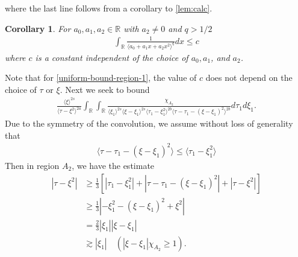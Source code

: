 \documentclass[12pt,reqno]{amsart}
\numberwithin{equation}{section}  %
\numberwithin{figure}{section}
\newcommand{\rr}{\mathbb{R}}
\theoremstyle{plain}
\newtheorem{corollary}{Corollary}
\theoremstyle{definition}
\theoremstyle{remark}
\begin{document}
%
%
where the last line follows from a corollary to \autoref{lem:calc}.
%
%
%
%
%
%
%
%
\begin{corollary}
  For $a_{0}, a_{1}, a_{2} \in \rr$ with $a_{2} \neq 0$ and $q > 1/2$
  \begin{equation*}
  \begin{split}
    \int_{\rr} \frac{1}{\langle a_{0} + a_{1}x + a_{2}x^{2} \rangle ^{q}} dx \le c
  \end{split}
  \end{equation*}
  where $c$ is a constant independent of the choice of $a_{0}, a_{1}$, and $a_{2}$.
\label{cor:integral-bound}
\end{corollary}
Note that for \eqref{uniform-bound-region-1}, the
value of $c$ does not depend on the choice of $\tau$ or $\xi$. 
Next we seek to bound
\begin{equation}
  \label{case-1-region-2}
  \begin{split}
    \frac{ \langle \xi
    \rangle ^{2s}}{\langle \tau - \xi^{2} \rangle ^{2a}}
    \int_{\rr} \int_{\rr} \frac{\chi_{A_{2}}}{ \langle \xi_{1} \rangle ^{2s} \langle \xi-\xi_{1} \rangle ^{2s} 
    \langle \tau_{1} - \xi_{1}^{2} \rangle^{2b} \langle  \tau - \tau_{1} -
    (\xi - \xi_{1})^{2} \rangle^{2b} }
    d \tau_1 d \xi_{1}.
  \end{split}
\end{equation}
Due to the symmetry of the convolution, we assume without loss of generality that
%
%
\begin{equation*}
\begin{split}
  \langle \tau - \tau_{1} - (\xi - \xi_{1})^{2} \rangle \le \langle
  \tau_{1} - \xi_{1}^{2}\rangle 
\end{split}
\end{equation*}
%
%
Then in region $A_{2}$, we have the estimate
%
%
\begin{equation}
\begin{split}
  | \tau - \xi^{2} |
  & \ge \frac{1}{3}\left[ | \tau_{1} - \xi_{1}^{2} | + | \tau -
  \tau_{1} - (\xi - \xi_{1})^{2}
  | + | \tau - \xi^{2} | \right]
  \\
  & \ge \frac{1}{3} | - \xi_{1}^{2} - (\xi - \xi_{1})^{2} + \xi^{2} |
  \\
  & = \frac{2}{3} | \xi_{1} | | \xi - \xi_{1} |
  \\
  & \gtrsim | \xi_{1} | \quad (| \xi - \xi_{1} |\chi_{A_{2}} \ge 1).
\end{split}
\label{region-2-smoothing}
\end{equation}
\end{document}
